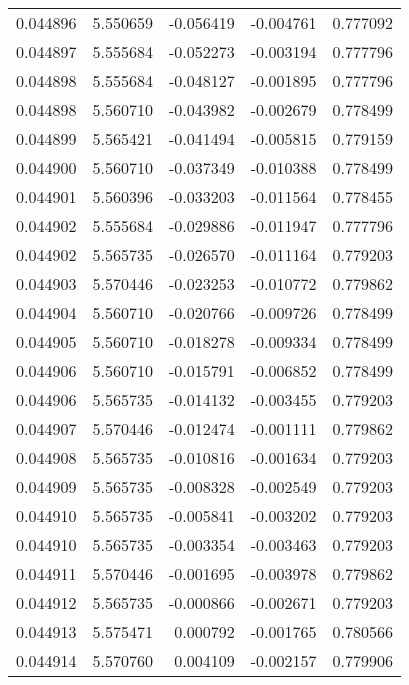 \begin{tabular}{lrrrr}
0.044896    &  5.550659 & -0.056419 & -0.004761 &             0.777092 \\
0.044897    &  5.555684 & -0.052273 & -0.003194 &             0.777796 \\
0.044898    &  5.555684 & -0.048127 & -0.001895 &             0.777796 \\
0.044898    &  5.560710 & -0.043982 & -0.002679 &             0.778499 \\
0.044899    &  5.565421 & -0.041494 & -0.005815 &             0.779159 \\
0.044900    &  5.560710 & -0.037349 & -0.010388 &             0.778499 \\
0.044901    &  5.560396 & -0.033203 & -0.011564 &             0.778455 \\
0.044902    &  5.555684 & -0.029886 & -0.011947 &             0.777796 \\
0.044902    &  5.565735 & -0.026570 & -0.011164 &             0.779203 \\
0.044903    &  5.570446 & -0.023253 & -0.010772 &             0.779862 \\
0.044904    &  5.560710 & -0.020766 & -0.009726 &             0.778499 \\
0.044905    &  5.560710 & -0.018278 & -0.009334 &             0.778499 \\
0.044906    &  5.560710 & -0.015791 & -0.006852 &             0.778499 \\
0.044906    &  5.565735 & -0.014132 & -0.003455 &             0.779203 \\
0.044907    &  5.570446 & -0.012474 & -0.001111 &             0.779862 \\
0.044908    &  5.565735 & -0.010816 & -0.001634 &             0.779203 \\
0.044909    &  5.565735 & -0.008328 & -0.002549 &             0.779203 \\
0.044910    &  5.565735 & -0.005841 & -0.003202 &             0.779203 \\
0.044910    &  5.565735 & -0.003354 & -0.003463 &             0.779203 \\
0.044911    &  5.570446 & -0.001695 & -0.003978 &             0.779862 \\
0.044912    &  5.565735 & -0.000866 & -0.002671 &             0.779203 \\
0.044913    &  5.575471 &  0.000792 & -0.001765 &             0.780566 \\
0.044914    &  5.570760 &  0.004109 & -0.002157 &             0.779906 \\

\end{tabular}
